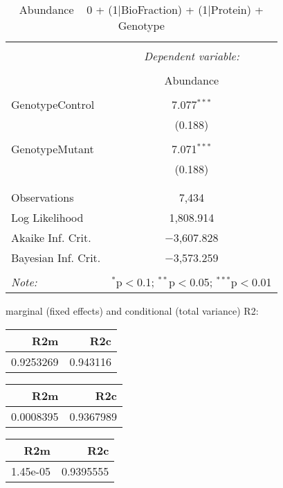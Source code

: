 \documentclass[11pt]{report}
\begin{document}
\begin{table}[!htbp] \centering 
  \caption{Abundance ~ 0 + (1|BioFraction) + (1|Protein) + Genotype} 
  \label{} 
\begin{tabular}{@{\extracolsep{5pt}}lc} 
\\[-1.8ex]\hline 
\hline \\[-1.8ex] 
 & \multicolumn{1}{c}{\textit{Dependent variable:}} \\ 
\cline{2-2} 
\\[-1.8ex] & Abundance \\ 
\hline \\[-1.8ex] 
 GenotypeControl & 7.077$^{***}$ \\ 
  & (0.188) \\ 
  & \\ 
 GenotypeMutant & 7.071$^{***}$ \\ 
  & (0.188) \\ 
  & \\ 
\hline \\[-1.8ex] 
Observations & 7,434 \\ 
Log Likelihood & 1,808.914 \\ 
Akaike Inf. Crit. & $-$3,607.828 \\ 
Bayesian Inf. Crit. & $-$3,573.259 \\ 
\hline 
\hline \\[-1.8ex] 
\textit{Note:}  & \multicolumn{1}{r}{$^{*}$p$<$0.1; $^{**}$p$<$0.05; $^{***}$p$<$0.01} \\ 
\end{tabular} 
\end{table} 
marginal (fixed effects) and conditional (total variance) R2:

\begin{tabular}{r|r}
\hline
R2m & R2c\\
\hline
0.9253269 & 0.943116\\
\hline
\end{tabular}

\begin{tabular}{r|r}
\hline
R2m & R2c\\
\hline
0.0008395 & 0.9367989\\
\hline
\end{tabular}

\begin{tabular}{r|r}
\hline
R2m & R2c\\
\hline
1.45e-05 & 0.9395555\\
\hline
\end{tabular}
\end{document}
